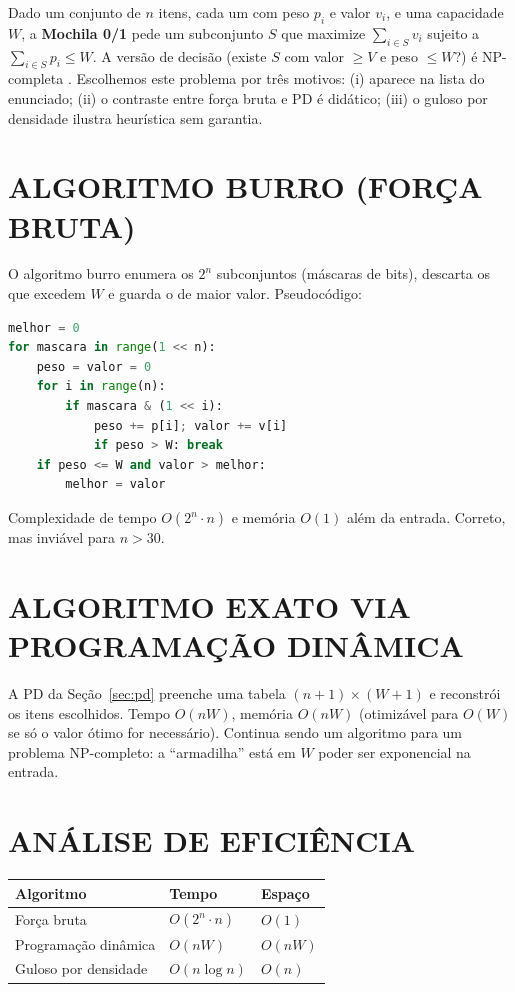 \documentclass[
    12pt,
    oneside,
    a4paper,
    chapter=TITLE,
    section=TITLE,
    sumario=abnt-6027-2012
]{abntex2}
\begin{document}
Dado um conjunto de $n$ itens, cada um com peso $p_i$ e valor $v_i$, e uma capacidade $W$, a \textbf{Mochila 0/1} pede um subconjunto $S$ que maximize $\sum_{i \in S} v_i$ sujeito a $\sum_{i \in S} p_i \leq W$. A versão de decisão (existe $S$ com valor $\geq V$ e peso $\leq W$?) é NP-completa \cite{garey,karp}. Escolhemos este problema por três motivos: (i) aparece na lista do enunciado; (ii) o contraste entre força bruta e PD é didático; (iii) o guloso por densidade ilustra heurística sem garantia.

\section{ALGORITMO BURRO (FORÇA BRUTA)}
\label{sec:burro}

O algoritmo burro enumera os $2^n$ subconjuntos (máscaras de bits), descarta os que excedem $W$ e guarda o de maior valor. Pseudocódigo:

\begin{lstlisting}[language=Python]
melhor = 0
for mascara in range(1 << n):
    peso = valor = 0
    for i in range(n):
        if mascara & (1 << i):
            peso += p[i]; valor += v[i]
            if peso > W: break
    if peso <= W and valor > melhor:
        melhor = valor
\end{lstlisting}

Complexidade de tempo $O(2^n \cdot n)$ e memória $O(1)$ além da entrada. Correto, mas inviável para $n > 30$.

\section{ALGORITMO EXATO VIA PROGRAMAÇÃO DINÂMICA}
\label{sec:exato}

A PD da Seção~\ref{sec:pd} preenche uma tabela $(n+1)\times(W+1)$ e reconstrói os itens escolhidos. Tempo $O(nW)$, memória $O(nW)$ (otimizável para $O(W)$ se só o valor ótimo for necessário). Continua sendo um algoritmo para um problema NP-completo: a ``armadilha'' está em $W$ poder ser exponencial na entrada.

\section{ANÁLISE DE EFICIÊNCIA}
\label{sec:eficiencia}

\begin{quadro}[!h]
    \centering
    \small
    \begin{tabular}{|l|l|l|}
        \hline
        \textbf{Algoritmo} & \textbf{Tempo} & \textbf{Espaço} \\
        \hline
        Força bruta & $O(2^n \cdot n)$ & $O(1)$ \\
        \hline
        Programação dinâmica & $O(nW)$ & $O(nW)$ \\
        \hline
        Guloso por densidade & $O(n \log n)$ & $O(n)$ \\
        \hline
    \end{tabular}
\end{quadro}
\end{document}
